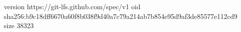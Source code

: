 version https://git-lfs.github.com/spec/v1
oid sha256:b9c18dff6670a60f8b038f9d40a7c79a214ab7b854e95d9af3de85577e112cd9
size 38323
